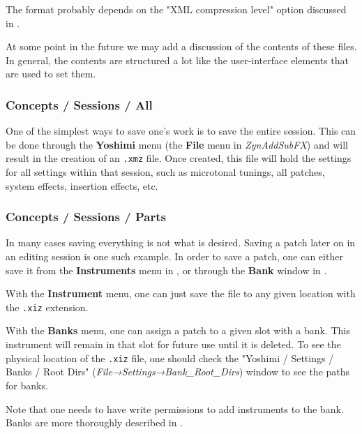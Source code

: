    The format probably depends on the "XML compression level" option
   discussed in
   .

   At some point in the future we may add a discussion of the contents of
   these files.  In general, the contents are structured a lot like the
   user-interface elements that are used to set them.

\subsubsection{Concepts / Sessions / All}
\label{subsec:concepts_sessions_all}

   One of the simplest ways to save one's work is to save the entire session.
   This can be done through the \textbf{Yoshimi} menu
   (the \textbf{File} menu in \textsl{ZynAddSubFX})
   and will result in the creation of
   an \texttt{.xmz} file. Once created, this file will hold the settings for
   all settings within that session, such as microtonal tunings, all
   patches, system effects, insertion effects, etc.

\subsubsection{Concepts / Sessions / Parts}
\label{subsec:concepts_sessions_parts}

   In many cases saving everything is not what is desired. Saving a patch
   later on in an editing session is one such example.
   In order to save a patch, one can either save it from the
   \textbf{Instruments} menu
   in ,
   or through the \textbf{Bank} window in
   .

   With the \textbf{Instrument} menu, one can just save the file to any
   given location with the \texttt{.xiz} extension.

   With the \textbf{Banks} menu, one can assign a patch to a given slot with
   a bank.  This instrument will remain in that slot for future use until it is
   deleted. To see the physical location of the \texttt{.xiz} file, one
   should check the
   "Yoshimi / Settings / Banks / Root Dirs"
   (\textsl{File→Settings→Bank\_Root\_Dirs}) window to see the paths for
   banks.

   Note that one needs to have write permissions to add instruments to the
   bank.
   Banks are more thoroughly described in
   .

